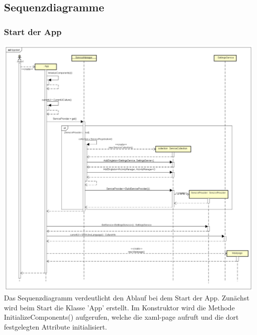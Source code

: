 \documentclass[a4paper,12pt]{article}
\begin{document}
\subsection{Sequenzdiagramme}

\subsubsection{Start der App}

\includegraphics[width=1.1\textwidth]{./Diagramme/AppstartSeqDia.png}\\
Das Sequenzdiagramm verdeutlicht den Ablauf bei dem Start der App. Zunächst wird beim Start die Klasse 'App' erstellt. 
Im Konstruktor wird die Methode InitializeComponents() aufgerufen, welche die xaml-page aufruft und die dort festgelegten Attribute initialisiert.\\
\end{document}
